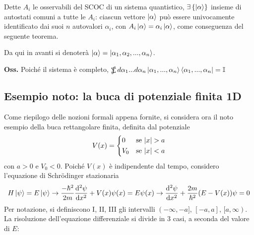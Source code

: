 Dette $ A_i $ le osservabili del SCOC di un sistema quantistico, $\exists\left\{\ket{\alpha}\right\}$ 
insieme di autostati comuni a tutte le $ A_i$:
ciascun vettore $ \ket{\alpha} $ può essere univocamente identificato dai suoi $ n $
autovalori $ \alpha_i $, con $ A_i\ket{\alpha} = \alpha_i\ket{\alpha} $, come conseguenza
del seguente teorema.

\noindent{}

Da qui in avanti si denoterà $ \ket{\alpha} = \ket{\alpha_1,\alpha_2,...,\alpha_n}$.

\textbf{Oss.} Poiché il sistema è completo,
$\sumint d\alpha_1...d\alpha_n \ket{\alpha_1,...,\alpha_n}\bra{\alpha_1,...,\alpha_n} =\mathbb{I}$

\subsection{Esempio noto: la buca di potenziale finita 1D}
Come riepilogo delle nozioni formali appena fornite, si considera ora il noto esempio della
buca rettangolare finita, definita dal potenziale
$$
V(x) = \begin{dcases}
 0   & \text{se } |x| > a \\
 V_0   & \text{se } |x| < a
\end{dcases}
$$
con $ a>0 $ e $ V_0 < 0 $. Poiché $ V(x) $ è indipendente dal tempo, considero l'equazione
di Schrödinger stazionaria
$$ H\ket{\psi} = E\ket{\psi} \to \frac{-\hbar^2}{2m}\dv[2]{\psi}{x} + V(x)\psi(x)= E\psi(x)
    \to \dv[2]{\psi}{x} + \frac{2m}{\hbar^2}(E-V(x))\psi = 0
$$ 
Per notazione, si definiscono I, II, III gli intervalli $ (-\infty,-a],\,[-a,a],\,[a,\infty)$. 
\newpage
La risoluzione dell'equazione differenziale si divide in 3 casi, a seconda del valore di $E$:

